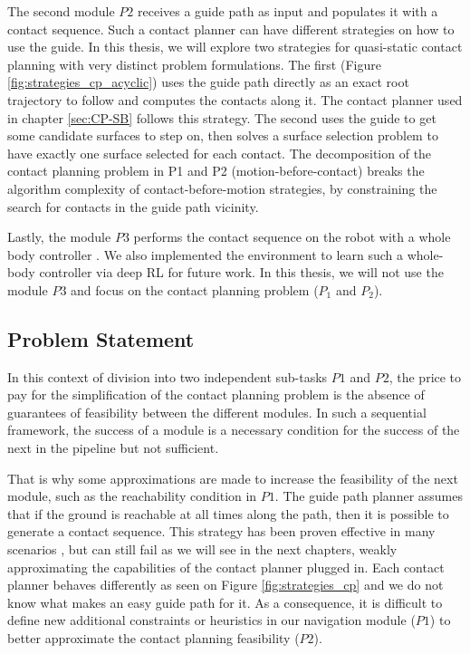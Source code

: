 The second module $P2$ receives a guide path as input and populates it with a contact sequence. Such a contact planner can have different strategies on how to use the guide. In this thesis, we will explore two strategies for quasi-static contact planning with very distinct problem formulations. 
The first (Figure \ref{fig:strategies_cp_acyclic}) uses the guide path directly as an exact root trajectory to follow and computes the contacts along it. The contact planner used in chapter \ref{sec:CP-SB} follows this strategy.
The second uses the guide to get some candidate surfaces to step on, then solves a surface selection problem to have exactly one surface selected for each contact.
The decomposition of the contact planning problem in P1 and P2 (motion-before-contact) breaks the algorithm complexity \cite{AcyclicCP,sl1m_v2} of contact-before-motion strategies, by constraining the search for contacts in the guide path vicinity.

Lastly, the module $P3$ performs the contact sequence on the robot with a whole body controller \cite{loco3d, tsid_prete, deepLoco}. We also implemented the environment to learn such a whole-body controller via deep RL \cite{software_robot_RL} for future work.
In this thesis, we will not use the module $P3$ and focus on the contact planning problem ($P_1$ and $P_2$).


\subsection{Problem Statement\label{subsub:problematic_leas}}

In this context of division into two independent sub-tasks $P1$ and $P2$, the price to pay for the simplification of the contact planning problem is the absence of guarantees of feasibility between the different modules.
In such a sequential framework, the success of a module is a necessary condition for the success of the next in the pipeline but not sufficient.

That is why some approximations are made to increase the feasibility of the next module, such as the reachability condition in $P1$. The guide path planner assumes that if the ground is reachable at all times along the path, then it is possible to generate a contact sequence. 
This strategy has been proven effective in many scenarios \cite{AcyclicCP}, but can still fail as we will see in the next chapters, weakly approximating the capabilities of the contact planner plugged in. Each contact planner behaves differently as seen on Figure \ref{fig:strategies_cp} and we do not know what makes an easy guide path for it. As a consequence, it is difficult to define new additional constraints or heuristics in our navigation module ($P1$) to better approximate the contact planning feasibility ($P2$).

